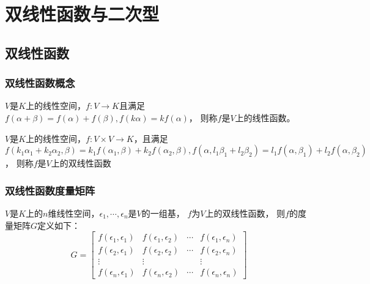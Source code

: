 



\chapter{双线性函数与二次型}


\section{双线性函数}

\subsection{双线性函数概念}

\begin{definition}[线性函数]
  $V$是$K$上的线性空间，$f : V \rightarrow K$且满足
  $f(\alpha + \beta) = f(\alpha) + f(\beta), f(k\alpha) = kf(\alpha)$，
  则称$f$是$V$上的线性函数。
\end{definition}

\begin{definition}[双线性函数]
  $V$是$K$上的线性空间，$f: V \times V \rightarrow K$，且满足
  $f(k_1\alpha_1 + k_2\alpha_2,\beta) = k_1f(\alpha_1,\beta) + k_2 f(\alpha_2,\beta), f(\alpha, l_1\beta_1 + l_2\beta_2) = l_1f(\alpha,\beta_1) + l_2 f(\alpha, \beta_2)$，
  则称$f$是$V$上的双线性函数
\end{definition}

\subsection{双线性函数度量矩阵}

\begin{definition}[度量矩阵]
  $V$是$K$上的$n$维线性空间，$\epsilon_1,\cdots,\epsilon_n$是$V$的一组基，
  $f$为$V$上的双线性函数，
  则$f$的度量矩阵$G$定义如下：
  \begin{equation*}
    G = \left[
      \begin{array}{cccc}
        f(\epsilon_1,\epsilon_1)&f(\epsilon_1,\epsilon_2)&\cdots & f(\epsilon_1,\epsilon_n) \\
                                f(\epsilon_2,\epsilon_1)&f(\epsilon_2,\epsilon_2)&\cdots&f(\epsilon_2,\epsilon_n)\\
                                \vdots&\vdots&&\vdots \\
                                f(\epsilon_n,\epsilon_1)&f(\epsilon_n,\epsilon_2)&\cdots&f(\epsilon_n,\epsilon_n)
      \end{array}
    \right]
  \end{equation*}
\end{definition}

